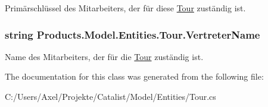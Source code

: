 Primärschlüssel des Mitarbeiters, der für diese \hyperlink{class_products_1_1_model_1_1_entities_1_1_tour}{Tour} zuständig ist. 

\subsubsection[{\texorpdfstring{Vertreter\+Name}{VertreterName}}]{\setlength{\rightskip}{0pt plus 5cm}string Products.\+Model.\+Entities.\+Tour.\+Vertreter\+Name\hspace{0.3cm}{\ttfamily [get]}}\hypertarget{class_products_1_1_model_1_1_entities_1_1_tour_a81eaded03434281b82187cae3047454c}{}\label{class_products_1_1_model_1_1_entities_1_1_tour_a81eaded03434281b82187cae3047454c}


Name des Mitarbeiters, der für die \hyperlink{class_products_1_1_model_1_1_entities_1_1_tour}{Tour} zuständig ist. 



The documentation for this class was generated from the following file\+:\begin{DoxyCompactItemize}
\item 
C\+:/\+Users/\+Axel/\+Projekte/\+Catalist/\+Model/\+Entities/Tour.\+cs\end{DoxyCompactItemize}
